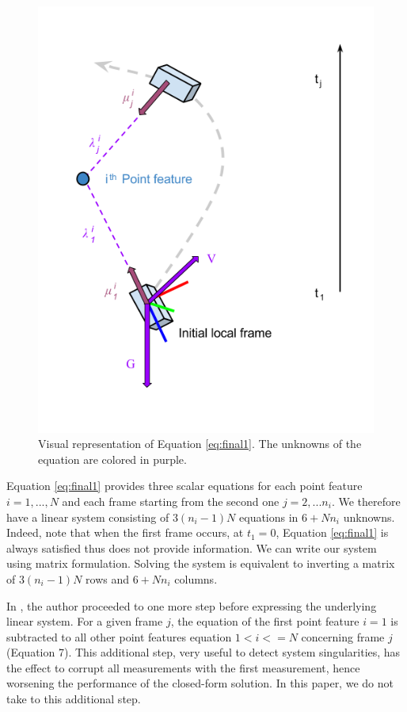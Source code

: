 \documentclass[letterpaper, 10 pt, conference]{ieeeconf}  %
\begin{document}
\begin{figure}
  \centering
  \includegraphics[width=0.90\columnwidth]{images/closedFormExplained}
  \caption{Visual representation of Equation \ref{eq:final1}.
  The unknowns of the equation are colored in \textcolor{amethyst}{purple}.}
\end{figure}

Equation \ref{eq:final1} provides three scalar equations for each point feature $i=1,...,N$ and each frame starting from the second one $j=2,...n_i$.
We therefore have a linear system consisting of $3(n_i-1)N$ equations in $6 + Nn_i$ unknowns.
Indeed, note that when the first frame occurs, at $t_1 = 0$,
Equation \ref{eq:final1} is always satisfied thus does not provide information.
We can write our system using matrix formulation.
Solving the system is equivalent to inverting a matrix of $3(n_i-1)N$ rows and $6+Nn_i$ columns.

In \cite{Martinelli2014}, the author proceeded to one more step before expressing the underlying linear system.
For a given frame $j$, the equation of the first point feature $i=1$ is subtracted to all other point features equation $1<i<=N$ concerning frame $j$ (Equation 7).
This additional step, very useful to detect system singularities, has the effect to corrupt all measurements with the first measurement,
hence worsening the performance of the closed-form solution.
In this paper, we do not take to this additional step.
\end{document}
